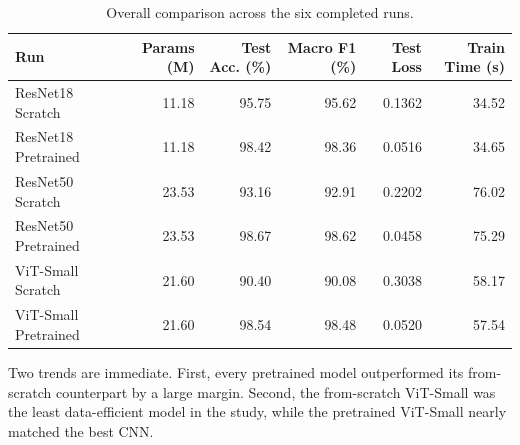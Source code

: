 \documentclass[11pt]{report}
\begin{document}
\begin{table}[h]
    \centering
    \caption{Overall comparison across the six completed runs.}
    \label{tab:overall-results}
    \small
    \begin{tabular}{lrrrrr}
        \toprule
        Run & Params (M) & Test Acc. (\%) & Macro F1 (\%) & Test Loss & Train Time (s) \\
        \midrule
        ResNet18 Scratch & 11.18 & 95.75 & 95.62 & 0.1362 & 34.52 \\
        ResNet18 Pretrained & 11.18 & 98.42 & 98.36 & 0.0516 & 34.65 \\
        ResNet50 Scratch & 23.53 & 93.16 & 92.91 & 0.2202 & 76.02 \\
        ResNet50 Pretrained & 23.53 & 98.67 & 98.62 & 0.0458 & 75.29 \\
        ViT-Small Scratch & 21.60 & 90.40 & 90.08 & 0.3038 & 58.17 \\
        ViT-Small Pretrained & 21.60 & 98.54 & 98.48 & 0.0520 & 57.54 \\
        \bottomrule
    \end{tabular}
\end{table}

Two trends are immediate. First, every pretrained model outperformed its from-scratch counterpart by a large margin. Second, the from-scratch ViT-Small was the least data-efficient model in the study, while the pretrained ViT-Small nearly matched the best CNN.
\end{document}
